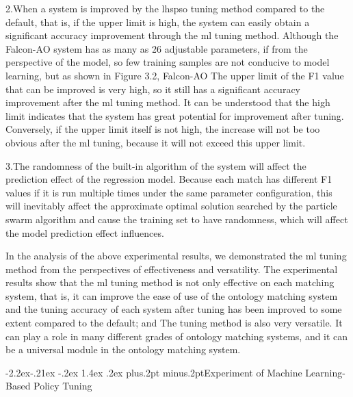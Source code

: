 \documentclass[twoside]{article}
\makeatletter
\def\subsubsection{\@startsection{subsubsection}{3}{\z@}%
 {-2.2ex\@plus -.21ex \@minus -.2ex}%
 {1.4ex \@plus.2ex}
{\normalfont\normalsize\protect\baselineskip=12pt plus.2pt minus.2pt\sl}}
\makeatother
\begin{document}
2.When a system is improved by the lhspso tuning method compared to the default, that is, if the upper limit is high, the system can easily obtain a significant accuracy improvement through the ml tuning method.
Although the Falcon-AO system has as many as 26 adjustable parameters, if from the perspective of the model, so few training samples are not conducive to model learning, but as shown in Figure 3.2, Falcon-AO The upper limit of the F1 value that can be improved is very high, so it still has a significant accuracy improvement after the ml tuning method. It can be understood that the high limit indicates that the system has great potential for improvement after tuning.
Conversely, if the upper limit itself is not high, the increase will not be too obvious after the ml tuning, because it will not exceed this upper limit.

3.The randomness of the built-in algorithm of the system will affect the prediction effect of the regression model.
Because each match has different F1 values if it is run multiple times under the same parameter configuration, this will inevitably affect the approximate optimal solution searched by the particle swarm algorithm and cause the training set to have randomness, which will affect the model prediction effect influences.

In the analysis of the above experimental results, we demonstrated the ml tuning method from the perspectives of effectiveness and versatility.
The experimental results show that the ml tuning method is not only effective on each matching system, that is, it can improve the ease of use of the ontology matching system and the tuning accuracy of each system after tuning has been improved to some extent compared to the default; and The tuning method is also very versatile. It can play a role in many different grades of ontology matching systems, and it can be a universal module in the ontology matching system.

\subsubsection{Experiment of Machine Learning-Based Policy Tuning}
\end{document}
